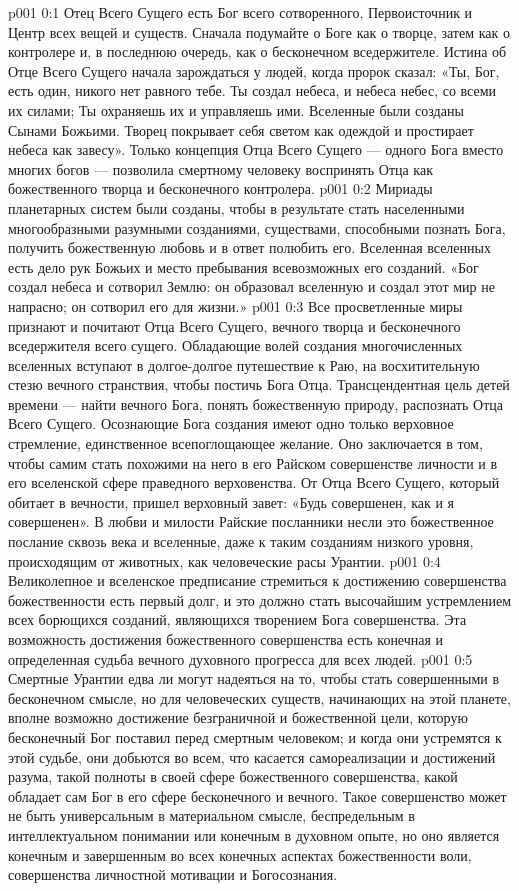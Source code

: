 \author{Божественный Советник}
\vs p001 0:1 Отец Всего Сущего есть Бог всего сотворенного, Первоисточник и Центр всех вещей и существ. Сначала подумайте о Боге как о творце, затем как о контролере и, в последнюю очередь, как о бесконечном вседержителе. Истина об Отце Всего Сущего начала зарождаться у людей, когда пророк сказал: «Ты, Бог, есть один, никого нет равного тебе. Ты создал небеса, и небеса небес, со всеми их силами; Ты охраняешь их и управляешь ими. Вселенные были созданы Сынами Божьими. Творец покрывает себя светом как одеждой и простирает небеса как завесу». Только концепция Отца Всего Сущего --- одного Бога вместо многих богов --- позволила смертному человеку воспринять Отца как божественного творца и бесконечного контролера.
\vs p001 0:2 Мириады планетарных систем были созданы, чтобы в результате стать населенными многообразными разумными созданиями, существами, способными познать Бога, получить божественную любовь и в ответ полюбить его. Вселенная вселенных есть дело рук Божьих и место пребывания всевозможных его созданий. «Бог создал небеса и сотворил Землю: он образовал вселенную и создал этот мир не напрасно; он сотворил его для жизни.»
\vs p001 0:3 Все просветленные миры признают и почитают Отца Всего Сущего, вечного творца и бесконечного вседержителя всего сущего. Обладающие волей создания многочисленных вселенных вступают в долгое\hyp{}долгое путешествие к Раю, на восхитительную стезю вечного странствия, чтобы постичь Бога Отца. Трансцендентная цель детей времени --- найти вечного Бога, понять божественную природу, распознать Отца Всего Сущего. Осознающие Бога создания имеют одно только верховное стремление, единственное всепоглощающее желание. Оно заключается в том, чтобы самим стать похожими на него в его Райском совершенстве личности и в его вселенской сфере праведного верховенства. От Отца Всего Сущего, который обитает в вечности, пришел верховный завет: «Будь совершенен, как и я совершенен». В любви и милости Райские посланники несли это божественное послание сквозь века и вселенные, даже к таким созданиям низкого уровня, происходящим от животных, как человеческие расы Урантии.
\vs p001 0:4 Великолепное и вселенское предписание стремиться к достижению совершенства божественности есть первый долг, и это должно стать высочайшим устремлением всех борющихся созданий, являющихся творением Бога совершенства. Эта возможность достижения божественного совершенства есть конечная и определенная судьба вечного духовного прогресса для всех людей.
\vs p001 0:5 Смертные Урантии едва ли могут надеяться на то, чтобы стать совершенными в бесконечном смысле, но для человеческих существ, начинающих на этой планете, вполне возможно достижение безграничной и божественной цели, которую бесконечный Бог поставил перед смертным человеком; и когда они устремятся к этой судьбе, они добьются во всем, что касается самореализации и достижений разума, такой полноты в своей сфере божественного совершенства, какой обладает сам Бог в его сфере бесконечного и вечного. Такое совершенство может не быть универсальным в материальном смысле, беспредельным в интеллектуальном понимании или конечным в духовном опыте, но оно является конечным и завершенным во всех конечных аспектах божественности воли, совершенства личностной мотивации и Богосознания.
